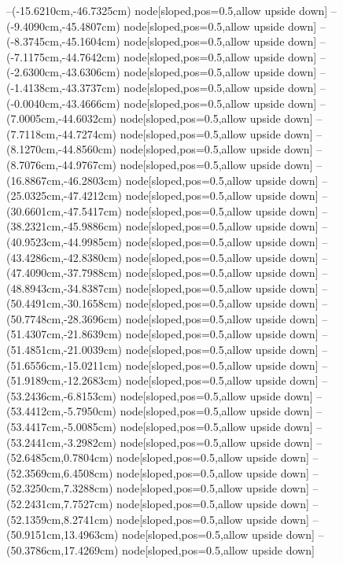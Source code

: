 --(-15.6210cm,-46.7325cm) node[sloped,pos=0.5,allow upside down]{\ArrowIn}
--(-9.4090cm,-45.4807cm) node[sloped,pos=0.5,allow upside down]{\ArrowIn}
--(-8.3745cm,-45.1604cm) node[sloped,pos=0.5,allow upside down]{\ArrowIn}
--(-7.1175cm,-44.7642cm) node[sloped,pos=0.5,allow upside down]{\ArrowIn}
--(-2.6300cm,-43.6306cm) node[sloped,pos=0.5,allow upside down]{\ArrowIn}
--(-1.4138cm,-43.3737cm) node[sloped,pos=0.5,allow upside down]{\ArrowIn}
--(-0.0040cm,-43.4666cm) node[sloped,pos=0.5,allow upside down]{\ArrowIn}
--(7.0005cm,-44.6032cm) node[sloped,pos=0.5,allow upside down]{\ArrowIn}
--(7.7118cm,-44.7274cm) node[sloped,pos=0.5,allow upside down]{\arrowIn}
--(8.1270cm,-44.8560cm) node[sloped,pos=0.5,allow upside down]{\arrowIn}
--(8.7076cm,-44.9767cm) node[sloped,pos=0.5,allow upside down]{\arrowIn}
--(16.8867cm,-46.2803cm) node[sloped,pos=0.5,allow upside down]{\ArrowIn}
--(25.0325cm,-47.4212cm) node[sloped,pos=0.5,allow upside down]{\ArrowIn}
--(30.6601cm,-47.5417cm) node[sloped,pos=0.5,allow upside down]{\ArrowIn}
--(38.2321cm,-45.9886cm) node[sloped,pos=0.5,allow upside down]{\ArrowIn}
--(40.9523cm,-44.9985cm) node[sloped,pos=0.5,allow upside down]{\ArrowIn}
--(43.4286cm,-42.8380cm) node[sloped,pos=0.5,allow upside down]{\ArrowIn}
--(47.4090cm,-37.7988cm) node[sloped,pos=0.5,allow upside down]{\ArrowIn}
--(48.8943cm,-34.8387cm) node[sloped,pos=0.5,allow upside down]{\ArrowIn}
--(50.4491cm,-30.1658cm) node[sloped,pos=0.5,allow upside down]{\ArrowIn}
--(50.7748cm,-28.3696cm) node[sloped,pos=0.5,allow upside down]{\ArrowIn}
--(51.4307cm,-21.8639cm) node[sloped,pos=0.5,allow upside down]{\ArrowIn}
--(51.4851cm,-21.0039cm) node[sloped,pos=0.5,allow upside down]{\arrowIn}
--(51.6556cm,-15.0211cm) node[sloped,pos=0.5,allow upside down]{\ArrowIn}
--(51.9189cm,-12.2683cm) node[sloped,pos=0.5,allow upside down]{\ArrowIn}
--(53.2436cm,-6.8153cm) node[sloped,pos=0.5,allow upside down]{\ArrowIn}
--(53.4412cm,-5.7950cm) node[sloped,pos=0.5,allow upside down]{\ArrowIn}
--(53.4417cm,-5.0085cm) node[sloped,pos=0.5,allow upside down]{\arrowIn}
--(53.2441cm,-3.2982cm) node[sloped,pos=0.5,allow upside down]{\ArrowIn}
--(52.6485cm,0.7804cm) node[sloped,pos=0.5,allow upside down]{\ArrowIn}
--(52.3569cm,6.4508cm) node[sloped,pos=0.5,allow upside down]{\ArrowIn}
--(52.3250cm,7.3288cm) node[sloped,pos=0.5,allow upside down]{\arrowIn}
--(52.2431cm,7.7527cm) node[sloped,pos=0.5,allow upside down]{\arrowIn}
--(52.1359cm,8.2741cm) node[sloped,pos=0.5,allow upside down]{\arrowIn}
--(50.9151cm,13.4963cm) node[sloped,pos=0.5,allow upside down]{\ArrowIn}
--(50.3786cm,17.4269cm) node[sloped,pos=0.5,allow upside down]{\ArrowIn}
